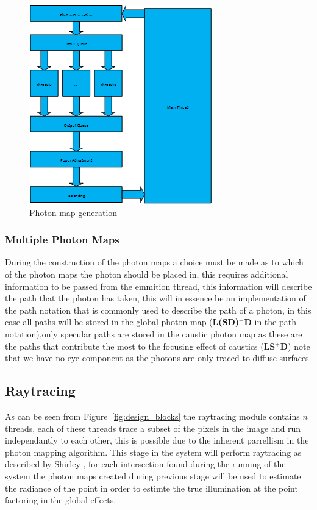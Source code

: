
\begin{figure}
\centering
\includegraphics{./images/photon_threading.png}
\caption{Photon map generation}
\label{fig:photon_generation}
\end{figure}

\subsubsection{Multiple Photon Maps}
During the construction of the photon maps a choice must be made as to which of the photon maps the photon
should be placed in, this requires additional information to be passed from the emmition thread, this information
will describe the path that the photon has taken, this will in essence be an implementation of the path notation
that is commonly used to describe the path of a photon, in this case all paths will be stored in the global photon
map (\textbf{L(S\textbar D)$^+$D} in the path notation),only specular paths are stored in the caustic photon map
as these are the paths that contribute the most to the focusing effect of caustics (\textbf{LS$^+$D}) note that
we have no eye component as the photons are only traced to diffuse surfaces.


\subsection{Raytracing}
As can be seen from Figure~\ref{fig:design_blocks} the raytracing module contains $n$ threads, each of these
threads trace a subset of the pixels in the image and run independantly to each other, this is possible due
to the inherent parrellism in the photon mapping algorithm. This stage in the system will perform raytracing
as described by Shirley \cite{shirley-dist}, for each intersection found during the running of the system the photon
maps created during previous stage will be used to estimate the radiance of the point in order to estimte the
true illumination at the point factoring in the global effects.

